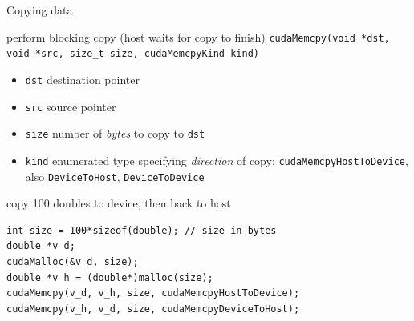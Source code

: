 \documentclass[aspectratio=43]{beamer}
\newcommand{\lst}[1]{\colorbox{white!90!blue}{\lstinline!#1!}}
\begin{document}
\begin{frame}[fragile]{Copying data}

    \begin{info}{perform blocking copy (host waits for copy to finish)}
        \centering \lst{cudaMemcpy(void *dst, void *src, size_t size, cudaMemcpyKind kind)}
    \begin{itemize}
        \item \lst{dst} destination pointer
        \item \lst{src} source pointer
        \item \lst{size} number of \emph{bytes} to copy to \lst{dst}
        \item \lst{kind} enumerated type specifying \emph{direction} of copy:
            \lst{cudaMemcpyHostToDevice}, also \lst{DeviceToHost}, \lst{DeviceToDevice}
    \end{itemize}
    \end{info}

    \begin{code}{copy 100 doubles to device, then back to host}
        \begin{lstlisting}[style=boxcuda]
int size = 100*sizeof(double); // size in bytes
double *v_d;
cudaMalloc(&v_d, size);
double *v_h = (double*)malloc(size);
cudaMemcpy(v_d, v_h, size, cudaMemcpyHostToDevice);
cudaMemcpy(v_h, v_d, size, cudaMemcpyDeviceToHost);
\end{lstlisting}
    \end{code}
\end{frame}
\end{document}
